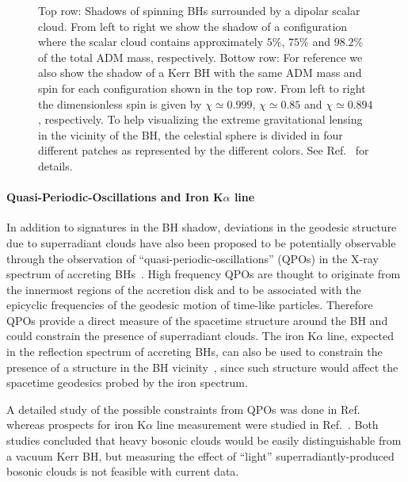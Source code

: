 \documentclass[11pt]{article}
\numberwithin{equation}{section} %
\begin{document}
\begin{figure}[thb]
\begin{center}
\begin{tabular}{ccc}
\end{tabular}
\caption{Top row: Shadows of spinning BHs surrounded by a dipolar scalar cloud. From left to right we show the shadow of a configuration where the scalar cloud contains approximately $5\%$, $75\%$ and $98.2\%$ of the total ADM mass, respectively. Bottow row: For reference we also show the shadow of a Kerr BH with the same ADM mass and spin for each configuration shown in the top row. From left to right the dimensionless spin is given by $\chi \simeq 0.999$, $\chi \simeq 0.85$  and $\chi \simeq 0.894$, respectively. To help visualizing the extreme gravitational lensing in the vicinity of the BH, the celestial sphere is divided in four different patches as represented by the different colors. See Ref.~\cite{Cunha:2015yba} for details.
 \label{fig:shadows}}
\end{center}
\end{figure}

\paragraph{Quasi-Periodic-Oscillations and Iron K$\alpha$ line} 
In addition to signatures in the BH shadow, deviations in the geodesic structure due to superradiant clouds have also been proposed to be potentially observable through the observation of ``quasi-periodic-oscillations'' (QPOs) in the X-ray spectrum of accreting BHs~\cite{Franchini:2016yvq}. High frequency QPOs are thought to originate from the innermost regions of the accretion disk and to be associated with the epicyclic frequencies of the geodesic  motion of time-like particles. Therefore QPOs provide a direct measure of the spacetime structure around the BH and could constrain the presence of superradiant clouds. The iron K$\alpha$ line, expected in the reflection spectrum of accreting BHs, can also be used to constrain the presence of a structure in the BH vicinity~\cite{Ni:2016rhz}, since such structure would affect the spacetime geodesics probed by the iron spectrum.


A detailed study of the possible constraints from QPOs was done in Ref.~\cite{Franchini:2016yvq} whereas prospects for iron K$\alpha$ line measurement were studied in Ref.~\cite{Ni:2016rhz}. Both studies concluded that heavy bosonic clouds would be easily distinguishable from a vacuum Kerr BH, but measuring the effect of ``light'' superradiantly-produced bosonic clouds is not feasible with current data.
\end{document}
